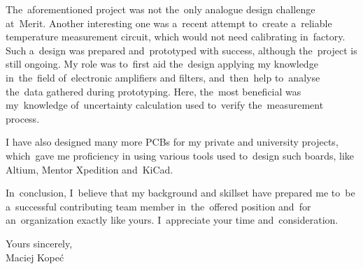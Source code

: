 \documentclass[11pt,a4paper,sans]{article}
\begin{document}
	The~aforementioned project was not the~only analogue design challenge at~Merit. Another 
	interesting one was a~recent
	attempt to~create a~reliable temperature measurement circuit, which would not need calibrating
	in~factory. Such a~design was prepared and~prototyped with success, although the~project is 
	still ongoing. My role was to~first aid the~design applying my knowledge 
	in~the~field of~electronic amplifiers and filters, and~then~help to~analyse the~data gathered
	during prototyping. Here, the~most beneficial was my~knowledge of~uncertainty calculation used 
	to~verify the~measurement process.
	
	I have also designed many more PCBs for my private and university projects, which~gave me
	proficiency in using various tools used to~design such boards, like Altium, Mentor Xpedition
	and~KiCad.
	
	In~conclusion, I~believe that my background and skillset have prepared me to~be a~successful 
	contributing team member in~the~offered position and~for an~organization exactly like 
	yours. I~appreciate your time and~consideration.

	\vspace{1\baselineskip}
	\hfill
	\begin{minipage}{0.3\linewidth}
		\begin{flushleft}
			Yours sincerely,
			\\\vspace{3\baselineskip}
			Maciej Kopeć
		\end{flushleft}
	\end{minipage}
	
\end{document}
